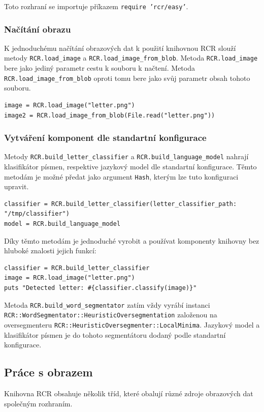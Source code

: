 \documentclass[a4paper]{article}
\begin{document}
Toto rozhraní se importuje příkazem \texttt{require 'rcr/easy'}.

\subsubsection{Načítání obrazu}
K jednoduchému načítání obrazových dat k použití knihovnou RCR slouží metody
\texttt{RCR.load\_image} a \texttt{RCR.load\_image\_from\_blob}. Metoda
\texttt{RCR.load\_image} bere jako jediný parametr cestu k souboru k načtení.
Metoda \texttt{RCR.load\_image\_from\_blob} oproti tomu bere jako svůj parametr
obsah tohoto souboru.
\begin{lstlisting}
image = RCR.load_image("letter.png")
image2 = RCR.load_image_from_blob(File.read("letter.png"))
\end{lstlisting}

\subsubsection{Vytváření komponent dle standartní konfigurace}
Metody \texttt{RCR.build\_letter\_classifier} a
\texttt{RCR.build\_language\_model} nahrají klasifikátor písmen, respektive jazykový model
dle standartní konfigurace. Těmto metodám je možné předat jako argument
\texttt{Hash}, kterým lze tuto konfiguraci upravit.
\begin{lstlisting}
classifier = RCR.build_letter_classifier(letter_classifier_path: "/tmp/classifier")
model = RCR.build_language_model
\end{lstlisting}

Díky těmto metodám je jednoduché vyrobit a používat komponenty knihovny
bez hluboké znalosti jejich funkcí:
\begin{lstlisting}
classifier = RCR.build_letter_classifier
image = RCR.load_image("letter.png")
puts "Detected letter: #{classifier.classify(image)}"
\end{lstlisting}

Metoda \texttt{RCR.build\_word\_segmentator} zatím vždy vyrábí instanci
\texttt{RCR::WordSegmentator::HeuristicOversegmentation} založenou na
oversegmenteru \texttt{RCR::HeuristicOversegmenter::LocalMinima}. Jazykový model
a klasifikátor písmen je do tohoto segmentátoru dodaný podle standartní
konfigurace.

\subsection{Práce s obrazem}
Knihovna RCR obsahuje několik tříd, které obalují různé zdroje obrazových dat
společným rozhraním.
\end{document}
